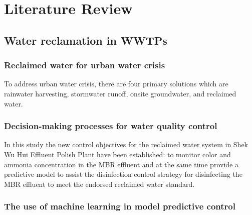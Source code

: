 \chapter{Literature Review}

\section{Water reclamation in WWTPs}
\subsection{Reclaimed water for urban water crisis}
To address urban water crisis, there are four primary solutions which are rainwater 
harvesting, stormwater runoff, onsite groundwater, and reclaimed water. \cite{exall_integrated_2012}

\subsection{Decision-making processes for water quality control}

In this study the new control objectives for the reclaimed water system in 
Shek Wu Hui Effluent Polish Plant have been established: to monitor color 
and ammonia concentration in the MBR effluent and at the same time provide 
a predictive model to assist the disinfection control strategy for disinfecting 
the MBR effluent to meet the endorsed reclaimed water standard.


\subsection{The use of machine learning in model predictive control}

